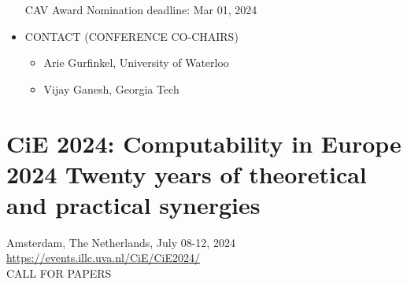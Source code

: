 \documentclass[prodmode,acmtecs]{acmsmall} %
\begin{document}
\begin{itemize}
CAV Award Nomination deadline: Mar 01, 2024 
 
\item  CONTACT (CONFERENCE CO-CHAIRS) 
 
\begin{itemize}\item  Arie Gurfinkel, University of Waterloo 
\item  Vijay Ganesh, Georgia Tech
\end{itemize} 
\end{itemize}\section{CiE 2024: Computability in Europe 2024 Twenty years of theoretical and practical synergies}\label{CiE2024}  Amsterdam, The Netherlands, July 08-12, 2024\\ 
  \href{https://events.illc.uva.nl/CiE/CiE2024/}{https://events.illc.uva.nl/CiE/CiE2024/}\\ 
CALL FOR PAPERS 
\end{document}
